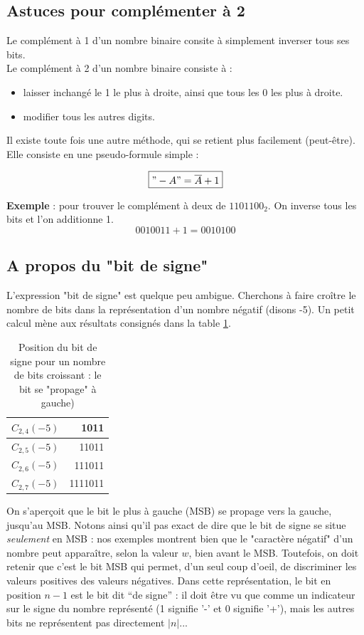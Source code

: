 \subsection{Astuces pour complémenter à 2}
Le complément à 1 d'un nombre binaire consite à simplement inverser tous ses bits.\\
Le complément à 2 d'un nombre binaire consiste à :
\begin{itemize}
\item laisser inchangé le 1 le plus à droite, ainsi que tous les 0 les plus à droite.
\item modifier tous les autres digits.
\end{itemize}

Il existe toute fois une autre méthode, qui se retient plus facilement (peut-être). Elle consiste en une pseudo-formule simple :

\begin{equation}
  \boxed{"-A"=\overline{A}+1}
\end{equation}

{\bf Exemple} : pour trouver le complément à deux de $1101100_2$. On inverse tous les bits et l'on additionne 1.
$$0010011 + 1 = 0010100$$

\subsection{A propos du "bit de signe"}

L'expression "bit de signe" est quelque peu ambigue. Cherchons à faire croître le nombre de bits dans la représentation d'un nombre négatif (disons -5).
Un petit calcul mène aux résultats consignés dans la table \ref{position_bit_signe}.
\begin{table}
 \centering
  \begin{tabular}{ | r | r |}
    \hline
    $C_{2,4}(-5)$ & 1011 \\ \hline
    $C_{2,5}(-5)$ & 11011 \\ \hline
    $C_{2,6}(-5)$ & 111011 \\ \hline
    $C_{2,7}(-5)$ & 1111011 \\ \hline
  \end{tabular}
  \caption{Position du bit de signe pour un nombre de bits croissant : le bit se "propage" à gauche)}
  \label{position_bit_signe}
\end{table}
On s'aperçoit que le bit le plus à gauche (MSB) se propage vers la gauche, jusqu'au MSB.
Notons ainsi qu'il pas exact de dire que le bit de signe se situe {\it seulement} en MSB : nos exemples
montrent bien que le "caractère négatif" d'un nombre peut apparaître, selon la valeur $w$, bien avant le MSB.
Toutefois, on doit retenir que c'est le bit MSB qui permet, d'un seul coup
d'oeil, de discriminer les valeurs positives des valeurs négatives.
Dans cette représentation, le bit en position $n-1$ est le bit dit ``de signe'' : il doit être vu que comme un indicateur sur le signe du nombre représenté
(1 signifie '-' et 0 signifie '+'), mais les autres bits ne représentent pas directement $|n|$...

